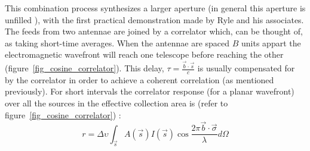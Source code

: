 \documentclass[a4paper,10pt]{report}
\begin{document}
This combination process synthesizes a larger aperture (in general this aperture is unfilled \cite{christiansenradiotelescopes}), with the first practical demonstration made by Ryle and his associates. The feeds from two antennae are joined by a 
correlator which, can be thought of, as taking short-time averages. When the antennae are spaced $B$ units appart the electromagnetic wavefront will reach one telescope before reaching the other (figure~\ref{fig_cosine_correlator}). This delay, 
$\tau=\frac{\vec{b}\cdot\vec{s}}{c}$ is usually compensated for by the correlator in order to achieve a coherent correlation (as mentioned previously). For short intervals the correlator response (for a planar wavefront) over all the sources in 
the effective collection area is (refer to figure~\ref{fig_cosine_correlator}) \cite{taylor1999synthesis}:
\begin{equation}
\label{eqn_cosine_correlation}
r=\Delta\upsilon \int_{\vec{s}}{A(\vec{s})I(\vec{s})\cos{\frac{2\pi\vec{b}\cdot\vec{\sigma}}{\lambda}}d\Omega}
\end{equation}
\end{document}
